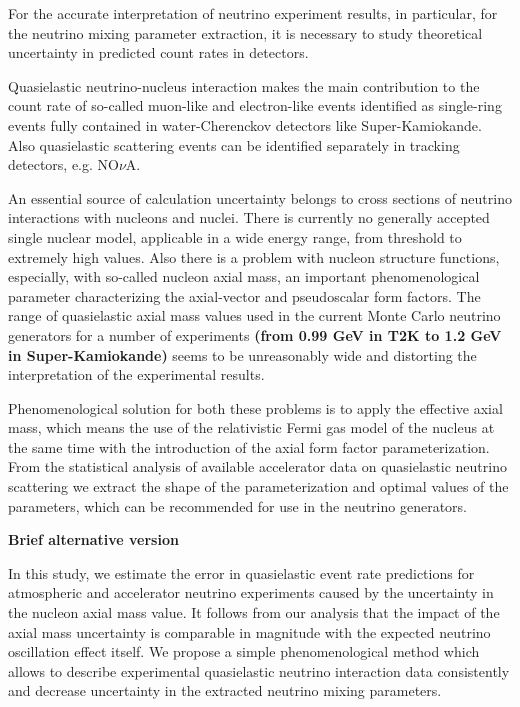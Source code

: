 For the accurate interpretation of neutrino experiment results, in particular, for the neutrino mixing parameter extraction, it is necessary to study theoretical uncertainty in predicted count rates in detectors.

Quasielastic neutrino-nucleus interaction makes the main contribution to the count rate of so-called muon-like and electron-like events identified as single-ring events fully contained in water-Cherenckov detectors like Super-Kamiokande. Also quasielastic scattering events can be identified separately in tracking detectors, e.g. NO$\nu$A.

An essential source of calculation uncertainty belongs to cross sections of neutrino interactions with nucleons and nuclei. There is currently no generally accepted single nuclear model, applicable in a wide energy range, from threshold to extremely high values. Also there is a problem with nucleon structure functions, especially, with so-called nucleon axial mass, an important phenomenological parameter characterizing the axial-vector and pseudoscalar form factors. The range of quasielastic axial mass values used in the current Monte Carlo neutrino generators for a number of experiments \textbf{(from 0.99 GeV in T2K to 1.2 GeV in Super-Kamiokande)} seems to be unreasonably wide and distorting the interpretation of the experimental results.

Phenomenological solution for both these problems is to apply the effective axial mass, which means the use of the relativistic Fermi gas model of the nucleus at the same time with the introduction of the axial form factor parameterization. From the statistical analysis of available accelerator data on quasielastic neutrino scattering we extract the shape of the parameterization and optimal values of the parameters, which can be recommended for use in the neutrino generators.

\textbf{Brief alternative version}

In this study, we estimate the error in quasielastic event rate predictions for atmospheric and accelerator neutrino experiments caused by the uncertainty in the nucleon axial mass value. It follows from our analysis that the impact of the axial mass uncertainty is comparable in magnitude with the expected neutrino oscillation effect itself. We propose a simple phenomenological method which allows to describe experimental quasielastic neutrino interaction data consistently and decrease uncertainty in the extracted neutrino mixing parameters.
